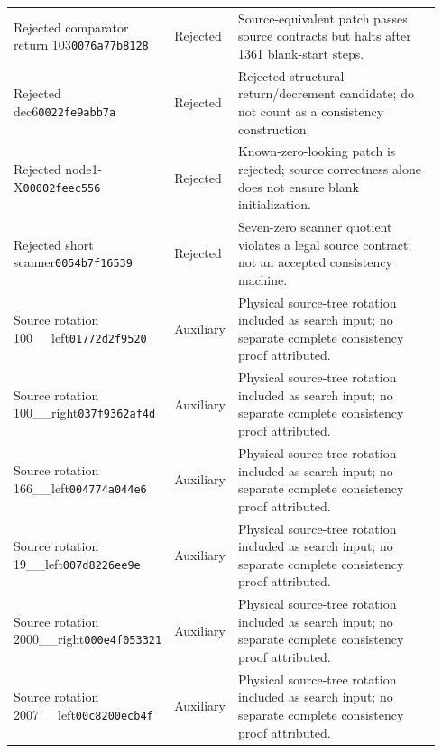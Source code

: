 {\begin{longtable}{@{}p{0.23\linewidth}p{0.13\linewidth}p{0.58\linewidth}@{}}
Rejected comparator return 103\newline\texttt{0076a77b8128} & Rejected & Source-equivalent patch passes source contracts but halts after 1361 blank-start steps.\\[2.5pt]
Rejected dec6\newline\texttt{0022fe9abb7a} & Rejected & Rejected structural return/decrement candidate; do not count as a consistency construction.\\[2.5pt]
Rejected node1-X\newline\texttt{00002feec556} & Rejected & Known-zero-looking patch is rejected; source correctness alone does not ensure blank initialization.\\[2.5pt]
Rejected short scanner\newline\texttt{0054b7f16539} & Rejected & Seven-zero scanner quotient violates a legal source contract; not an accepted consistency machine.\\[2.5pt]
Source rotation 100\_\allowbreak 164\_\allowbreak left\newline\texttt{01772d2f9520} & Auxiliary & Physical source-tree rotation included as search input; no separate complete consistency proof attributed.\\[2.5pt]
Source rotation 100\_\allowbreak 174\_\allowbreak right\newline\texttt{037f9362af4d} & Auxiliary & Physical source-tree rotation included as search input; no separate complete consistency proof attributed.\\[2.5pt]
Source rotation 166\_\allowbreak 179\_\allowbreak left\newline\texttt{004774a044e6} & Auxiliary & Physical source-tree rotation included as search input; no separate complete consistency proof attributed.\\[2.5pt]
Source rotation 19\_\allowbreak 29\_\allowbreak left\newline\texttt{007d8226ee9e} & Auxiliary & Physical source-tree rotation included as search input; no separate complete consistency proof attributed.\\[2.5pt]
Source rotation 2000\_\allowbreak 2001\_\allowbreak right\newline\texttt{000e4f053321} & Auxiliary & Physical source-tree rotation included as search input; no separate complete consistency proof attributed.\\[2.5pt]
Source rotation 2007\_\allowbreak 2008\_\allowbreak left\newline\texttt{00c8200ecb4f} & Auxiliary & Physical source-tree rotation included as search input; no separate complete consistency proof attributed.\\[2.5pt]

\end{longtable}}
